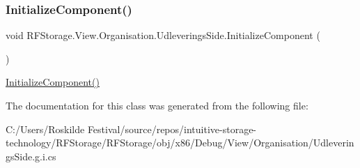\subsubsection{\texorpdfstring{InitializeComponent()}{InitializeComponent()}}
{\footnotesize\ttfamily void R\+F\+Storage.\+View.\+Organisation.\+Udleverings\+Side.\+Initialize\+Component (\begin{DoxyParamCaption}{ }\end{DoxyParamCaption})}



\mbox{\hyperlink{class_r_f_storage_1_1_view_1_1_organisation_1_1_udleverings_side_a8d5ae248b319e06d97af6db355bd13e1}{Initialize\+Component()}} 



The documentation for this class was generated from the following file\+:\begin{DoxyCompactItemize}
\item 
C\+:/\+Users/\+Roskilde Festival/source/repos/intuitive-\/storage-\/technology/\+R\+F\+Storage/\+R\+F\+Storage/obj/x86/\+Debug/\+View/\+Organisation/Udleverings\+Side.\+g.\+i.\+cs\end{DoxyCompactItemize}

